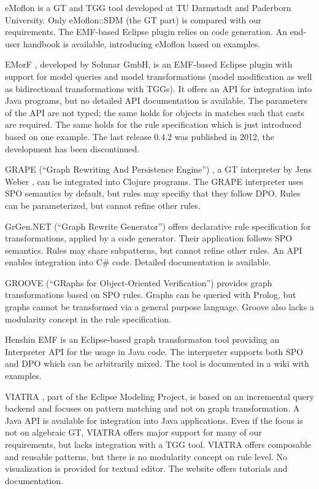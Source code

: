 eMoflon \cite{eMoflonWebsite} is a GT and TGG tool developed at TU Darmstadt and Paderborn University.
Only eMoflon::SDM (the GT part) is compared with our requirements.
The EMF-based Eclipse plugin relies on code generation.
An end-user handbook \cite{eMoflonHandbook} is available, introducing eMoflon based on examples.

EMorF \cite{EMorFWebsite}, developed by Solunar GmbH, is an EMF-based Eclipse plugin with support for model queries and model transformations (model modification as well as bidirectional transformations with TGGs).
It offers an API for integration into Java programs, but no detailed API documentation is available.
The parameters of the API are not typed; the same holds for objects in matches such that casts are required.
The same holds for the rule specification which is just introduced based on one example.
The last release 0.4.2 was published in 2012, the development has been discontinued.

GRAPE (``Graph Rewriting And Persistence Engine'') \cite{GRAPEWebsite}, a GT interpreter by Jens Weber \cite{GRAPE}, can be integrated into Clojure programs.
The GRAPE interpreter uses SPO semantics by default, but rules may specifiy that they follow DPO.
Rules can be parameterized, but cannot refine other rules.

GrGen.NET (``Graph Rewrite Generator'') \cite{GrGenWebsite} offers declarative rule specification for transformations, applied by a code generator.
Their application follows SPO semantics.
Rules may share subpatterns, but cannot refine other rules.
An API enables integration into C\# code.
Detailed documentation \cite{GrGenUserManual} is available.

GROOVE (``GRaphs for Object-Oriented Verification'') \cite{GrooveWebsite} provides graph transformations based on SPO rules.
Graphs can be queried with Prolog, but graphs cannot be transformed via a general purpose language.
Groove also lacks a modularity concept in the rule specification.

Henshin EMF \cite{HenshinEMFWebsite} is an Eclipse-based graph transformaton tool providing an Interpreter API for the usage in Java code.
The interpreter supports both SPO and DPO which can be arbitrarily mixed.
The tool is documented in a wiki \cite{HenshinEMFWiki} with examples.

VIATRA \cite{VIATRAWebsite}, part of the Eclipse Modeling Project, is based on an incremental query backend and focuses on pattern matching and not on graph transformation.
A Java API is available for integration into Java applications.
Even if the focus is not on algebraic GT, VIATRA offers major support for many of our requirements, but lacks integration with a TGG tool.
VIATRA offers composable and reusable patterns, but there is no modularity concept on rule level.
No visualization is provided for textual editor.
The website offers tutorials and documentation.
